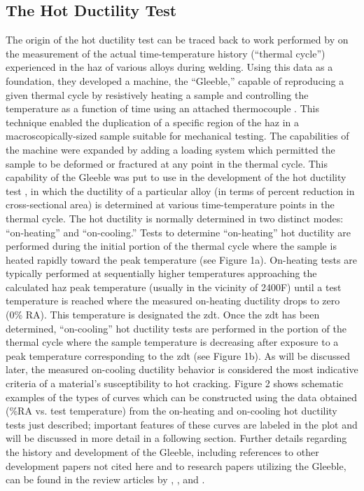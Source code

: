 \subsection{The Hot Ductility Test}
The origin of the hot ductility test can be traced back to work performed by \citet{nippes_cooling_1949} on the measurement of the actual time-temperature history (“thermal cycle”) experienced in the \gls{haz} of various alloys during welding.  Using this data as a foundation, they developed a machine, the “Gleeble,” capable of reproducing a given thermal cycle by resistively heating a sample and controlling the temperature as a function of time using an attached thermocouple \cite{nippes_development_1949}. This technique enabled the duplication of a specific region of the \gls{haz} in a macroscopically-sized sample suitable for mechanical testing.  The capabilities of the machine were expanded by adding a loading system which permitted the sample to be deformed or fractured at any point in the thermal cycle.  This capability of the Gleeble was put to use in the development of the hot ductility test \cite{nippes_investigation_1955}, in which the ductility of a particular alloy (in terms of percent reduction in cross-sectional area) is determined at various time-temperature points in the thermal cycle.  The hot ductility is normally determined in two distinct modes: “on-heating” and “on-cooling.”  Tests to determine “on-heating” hot ductility are performed during the initial portion of the thermal cycle where the sample is heated rapidly toward the peak temperature (see Figure 1a).  On-heating tests are typically performed at sequentially higher temperatures approaching the calculated \gls{haz} peak temperature (usually in the vicinity of 2400\textdegree{}F) until a test temperature is reached where the measured on-heating ductility drops to zero (0\% RA).  This temperature is designated the \gls{zdt}.  Once the \gls{zdt} has been determined, “on-cooling” hot ductility tests are performed in the portion of the thermal cycle where the sample temperature is decreasing after exposure to a peak temperature corresponding to the \gls{zdt} (see Figure 1b).  As will be discussed later, the measured on-cooling ductility behavior is considered the most indicative criteria of a material’s susceptibility to hot cracking.  Figure 2 shows schematic examples of the types of curves which can be constructed using the data obtained (\%RA vs. test temperature) from the on-heating and on-cooling hot ductility tests just described; important features of these curves are labeled in the plot and will be discussed in more detail in a following section. Further details regarding the history and development of the Gleeble, including references to other development papers not cited here and to research papers utilizing the Gleeble, can be found in the review articles by \citet{savage_apparatus_1962}, \citet{lundin_historical_1997}, and \citet{lundin_standardization_1990_history}. 

